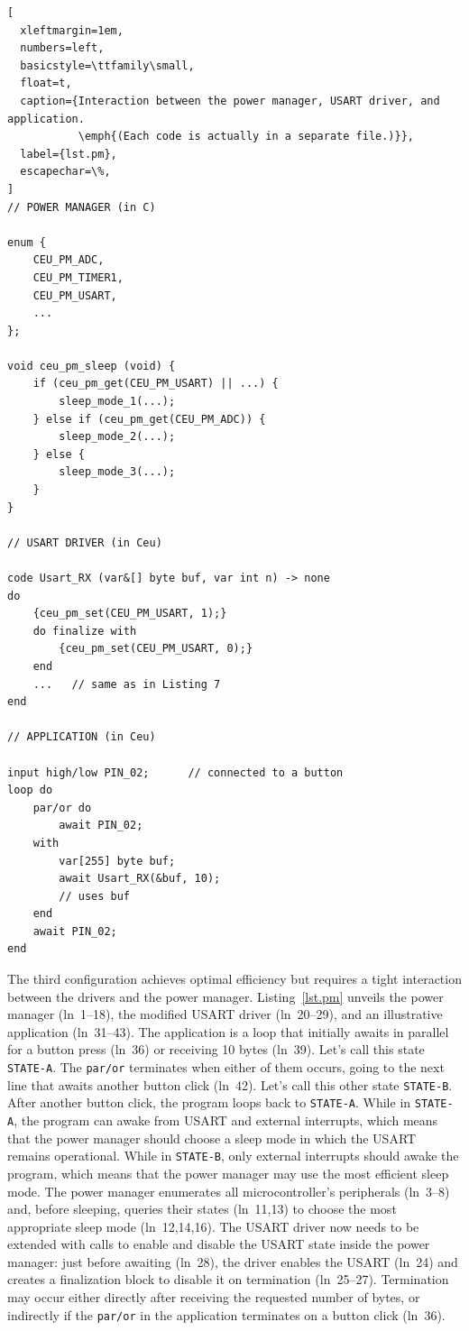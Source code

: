 \documentclass[sigplan,10pt,review,anonymous]{acmart}\settopmatter{printfolios=true,printccs=false,printacmref=false}
\newcommand{\code}[1] {{\small{\texttt{#1}}}}
\begin{document}
\begin{lstlisting}[
  xleftmargin=1em,
  numbers=left,
  basicstyle=\ttfamily\small,
  float=t,
  caption={Interaction between the power manager, USART driver, and application.
           \emph{(Each code is actually in a separate file.)}},
  label={lst.pm},
  escapechar=\%,
]
// POWER MANAGER (in C)

enum {
    CEU_PM_ADC,
    CEU_PM_TIMER1,
    CEU_PM_USART,
    ...
};

void ceu_pm_sleep (void) {
    if (ceu_pm_get(CEU_PM_USART) || ...) {
        sleep_mode_1(...);
    } else if (ceu_pm_get(CEU_PM_ADC)) {
        sleep_mode_2(...);
    } else {
        sleep_mode_3(...);
    }
}

// USART DRIVER (in Ceu)

code Usart_RX (var&[] byte buf, var int n) -> none
do
    {ceu_pm_set(CEU_PM_USART, 1);}
    do finalize with
        {ceu_pm_set(CEU_PM_USART, 0);}
    end
    ...   // same as in Listing 7
end

// APPLICATION (in Ceu)

input high/low PIN_02;      // connected to a button
loop do
    par/or do
        await PIN_02;
    with
        var[255] byte buf;
        await Usart_RX(&buf, 10);
        // uses buf
    end
    await PIN_02;
end
\end{lstlisting}

The third configuration achieves optimal efficiency but requires a tight
interaction between the drivers and the power manager.
%
Listing~\ref{lst.pm} unveils the power manager (ln~1--18), the modified USART
driver (ln~20--29), and an illustrative application (ln~31--43).
%
The application is a loop that initially awaits in parallel for a button press (ln~36) or
receiving 10 bytes (ln~39).
Let's call this state \code{STATE-A}.
The \code{par/or} terminates when either of them occurs, going to the next line
that awaits another button click (ln~42).
Let's call this other state \code{STATE-B}.
After another button click, the program loops back to \code{STATE-A}.
%
While in \code{STATE-A}, the program can awake from USART and external
interrupts, which means that the power manager should choose a sleep mode in
which the USART remains operational.
%
While in \code{STATE-B}, only external interrupts should awake the program,
which means that the power manager may use the most efficient sleep mode.
%
The power manager enumerates all microcontroller's peripherals (ln~3--8) and,
before sleeping, queries their states (ln~11,13) to choose the most appropriate
sleep mode (ln~12,14,16).
%
The USART driver now needs to be extended with calls to enable and disable the
USART state inside the power manager: just before awaiting (ln~28), the driver enables
the USART (ln~24) and creates a finalization block to disable it on
termination (ln~25--27).
Termination may occur either directly after receiving the requested number of
bytes, or indirectly if the \code{par/or} in the application terminates on a
button click (ln~36).
\end{document}
